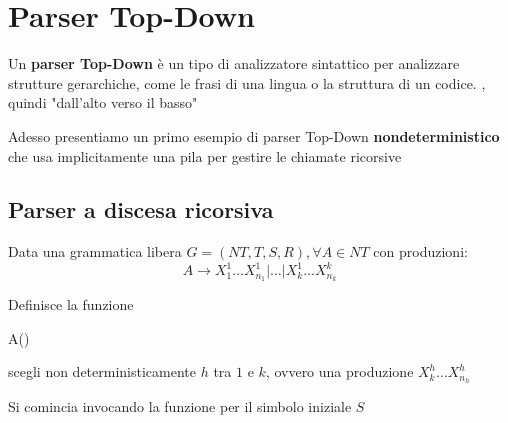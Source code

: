 \chapter{Parser Top-Down}
Un \textbf{parser Top-Down} è un tipo di analizzatore sintattico per analizzare strutture gerarchiche, come le frasi di una lingua o la struttura di un codice. , quindi "dall'alto verso il basso"

Adesso presentiamo un primo esempio di parser Top-Down \textbf{nondeterministico} che usa implicitamente una pila per gestire le chiamate ricorsive

\section{Parser a discesa ricorsiva}
Data una grammatica libera $G = (NT,T,S,R),\forall A\in NT$ con produzioni:
\[
    A\to X_1^1\dots X^1_{n_1} |\dots|    X_k^1\dots X^k_{n_k}
\]

Definisce la funzione
\begin{algorithm}
    \caption{A()}

    scegli non deterministicamente $h$ tra $1$ e $k$, ovvero una produzione $X_k^h\dots X^h_{n_h}$\;
\end{algorithm}

Si comincia invocando la funzione per il simbolo iniziale $S$

